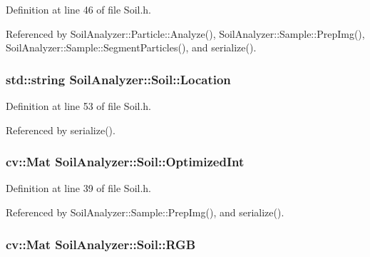Definition at line 46 of file Soil.\+h.



Referenced by Soil\+Analyzer\+::\+Particle\+::\+Analyze(), Soil\+Analyzer\+::\+Sample\+::\+Prep\+Img(), Soil\+Analyzer\+::\+Sample\+::\+Segment\+Particles(), and serialize().

\hypertarget{class_soil_analyzer_1_1_soil_a9c3cabd71691bfc4bb56d32fdb298e72}{}
\subsubsection[{Location}]{\setlength{\rightskip}{0pt plus 5cm}std\+::string Soil\+Analyzer\+::\+Soil\+::\+Location}\label{class_soil_analyzer_1_1_soil_a9c3cabd71691bfc4bb56d32fdb298e72}


Definition at line 53 of file Soil.\+h.



Referenced by serialize().

\hypertarget{class_soil_analyzer_1_1_soil_a27f7c15f63cbf64c07ceedb30c25e861}{}
\subsubsection[{Optimized\+Int}]{\setlength{\rightskip}{0pt plus 5cm}cv\+::\+Mat Soil\+Analyzer\+::\+Soil\+::\+Optimized\+Int\hspace{0.3cm}{\ttfamily [protected]}}\label{class_soil_analyzer_1_1_soil_a27f7c15f63cbf64c07ceedb30c25e861}


Definition at line 39 of file Soil.\+h.



Referenced by Soil\+Analyzer\+::\+Sample\+::\+Prep\+Img(), and serialize().

\hypertarget{class_soil_analyzer_1_1_soil_a4a328e0ebe7f1f3c5a1c4c581180d19e}{}
\subsubsection[{R\+G\+B}]{\setlength{\rightskip}{0pt plus 5cm}cv\+::\+Mat Soil\+Analyzer\+::\+Soil\+::\+R\+G\+B}\label{class_soil_analyzer_1_1_soil_a4a328e0ebe7f1f3c5a1c4c581180d19e}


